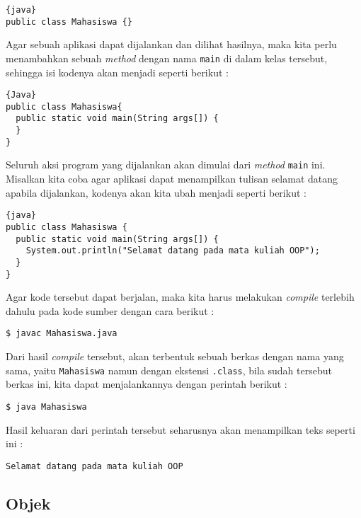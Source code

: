 \begin{lstlisting}{java}
public class Mahasiswa {}
\end{lstlisting}

Agar sebuah aplikasi dapat dijalankan dan dilihat hasilnya, maka kita perlu menambahkan sebuah \textit{method} dengan nama \texttt{main} di dalam kelas tersebut, sehingga isi kodenya akan menjadi seperti berikut :

\begin{lstlisting}{Java}
public class Mahasiswa{
  public static void main(String args[]) {
  }
}
\end{lstlisting}

Seluruh aksi program yang dijalankan akan dimulai dari \textit{method} \texttt{main} ini. Misalkan kita coba agar aplikasi dapat menampilkan tulisan selamat datang apabila dijalankan, kodenya akan kita ubah menjadi seperti berikut :

\begin{lstlisting}{java}
public class Mahasiswa {
  public static void main(String args[]) {
    System.out.println("Selamat datang pada mata kuliah OOP");
  }
}
\end{lstlisting}

Agar kode tersebut dapat berjalan, maka kita harus melakukan \textit{compile} terlebih dahulu pada kode sumber dengan cara berikut :

\begin{lstlisting}
$ javac Mahasiswa.java
\end{lstlisting}

Dari hasil \textit{compile} tersebut, akan terbentuk sebuah berkas dengan nama yang sama, yaitu \texttt{Mahasiswa} namun dengan ekstensi \texttt{.class}, bila sudah tersebut berkas ini, kita dapat menjalankannya dengan perintah berikut :

\begin{lstlisting}
$ java Mahasiswa
\end{lstlisting}

Hasil keluaran dari perintah tersebut seharusnya akan menampilkan teks seperti ini :

\begin{lstlisting}
Selamat datang pada mata kuliah OOP
\end{lstlisting}

\subsection{Objek}

